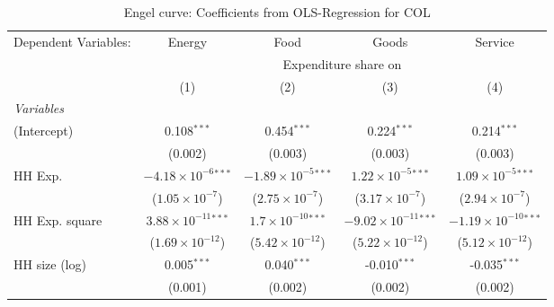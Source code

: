 
\begin{table}[htbp!]
   \centering
   \small
   \begin{adjustbox}{width = 1\textwidth, max height = 0.95\textheight, center}
      \begin{threeparttable}[b]
         \caption{\label{tab:Engel_parametric_COL} Engel curve: Coefficients from OLS-Regression for COL}
         \begin{tabular}{lcccc}
            \tabularnewline \midrule \midrule
            Dependent Variables: & Energy                         & Food                           & Goods                           & Service\\  
             & \multicolumn{4}{c}{Expenditure share on} \\ 
                                 & (1)                            & (2)                            & (3)                             & (4)\\  
            \midrule
            \emph{Variables}\\
            (Intercept)          & 0.108$^{***}$                  & 0.454$^{***}$                  & 0.224$^{***}$                   & 0.214$^{***}$\\   
                                 & (0.002)                        & (0.003)                        & (0.003)                         & (0.003)\\   
            HH Exp.              & $-4.18\times 10^{-6}$$^{***}$  & $-1.89\times 10^{-5}$$^{***}$  & $1.22\times 10^{-5}$$^{***}$    & $1.09\times 10^{-5}$$^{***}$\\    
                                 & ($1.05\times 10^{-7}$)         & ($2.75\times 10^{-7}$)         & ($3.17\times 10^{-7}$)          & ($2.94\times 10^{-7}$)\\    
            HH Exp. square       & $3.88\times 10^{-11}$$^{***}$  & $1.7\times 10^{-10}$$^{***}$   & $-9.02\times 10^{-11}$$^{***}$  & $-1.19\times 10^{-10}$$^{***}$\\    
                                 & ($1.69\times 10^{-12}$)        & ($5.42\times 10^{-12}$)        & ($5.22\times 10^{-12}$)         & ($5.12\times 10^{-12}$)\\    
            HH size (log)        & 0.005$^{***}$                  & 0.040$^{***}$                  & -0.010$^{***}$                  & -0.035$^{***}$\\   
                                 & (0.001)                        & (0.002)                        & (0.002)                         & (0.002)\\   

\end{tabular}
\end{threeparttable}
\end{adjustbox}
\end{table}
